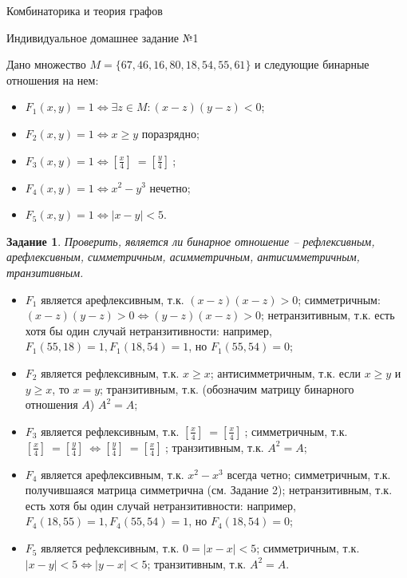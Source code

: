 \documentclass[a4paper, 14pt]{article}
\begin{document}

\newcommand{\problemset}[1]{
		\begin{center}
			\large #1
		\end{center}
	}
\renewcommand*{\proofname}{Решение}
\problemset{Комбинаторика и теория графов}
\problemset{Индивидуальное домашнее задание №1}


Дано множество $M = \{ 67, 46, 16, 80, 18, 54, 55, 61 \}$ и следующие бинарные отношения на нем:

\begin{itemize}
    \item $F_1(x,y) = 1 \Leftrightarrow \exists z \in M: (x-z)(y-z) < 0$;
    
    \item $F_2(x,y) = 1 \Leftrightarrow x \ge y$ поразрядно;
    
    \item $F_3(x,y) = 1 \Leftrightarrow [\frac{x}{4}]\ = [\frac{y}{4}]\ $;
    \item $F_4(x,y) = 1 \Leftrightarrow x^2 - y^3$ нечетно;
    \item $F_5(x,y) = 1 \Leftrightarrow |x - y| < 5$.
\end{itemize}
\newtheorem{problem}{Задание}

\begin{problem}
Проверить, является ли бинарное отношение -- рефлексивным, арефлексивным, симметричным, асимметричным, антисимметричным, транзитивным.
	
\end{problem}
\begin{itemize}
	    \item $F_1$ является арефлексивным, т.к. $(x-z)(x-z)>0$; симметричным: $(x-z)(y-z)>0 \Leftrightarrow (y-z)(x-z)>0$; нетранзитивным, т.к. есть хотя бы один случай нетранзитивности: например, $F_1(55, 18) = 1, F_1(18, 54) = 1$, но $F_1(55, 54) = 0$; 
            \item $F_2$ является рефлексивным, т.к. $x \ge x$; антисимметричным, т.к. если $x \ge y$ и $y \ge x$, то $x = y$; транзитивным, т.к. (обозначим матрицу бинарного отношения $A$) $A^2 = A$;
            \item $F_3$ является рефлексивным, т.к. $[\frac{x}{4}]\ = [\frac{x}{4}]\ $; симметричным, т.к.  $[\frac{x}{4}]\ = [\frac{y}{4}]\ \Leftrightarrow [\frac{y}{4}]\ = [\frac{x}{4}]\ $; транзитивным, т.к.  $A^2 = A$;
            \item $F_4$ является арефлексивным, т.к. $x^2 - x^3$ всегда четно; симметричным, т.к. получившаяся матрица симметрична (см. Задание 2); нетранзитивным, т.к. есть хотя бы один случай нетранзитивности: например, $F_4(18, 55) = 1, F_4(55, 54) = 1$, но $F_4(18, 54) = 0$;
            \item $F_5$ является рефлексивным, т.к. $0 = |x - x| < 5$; симметричным, т.к. $|x - y| < 5 \Leftrightarrow |y - x| < 5$; транзитивным, т.к. $A^2 = A$.
	\end{itemize}
\end{document}

